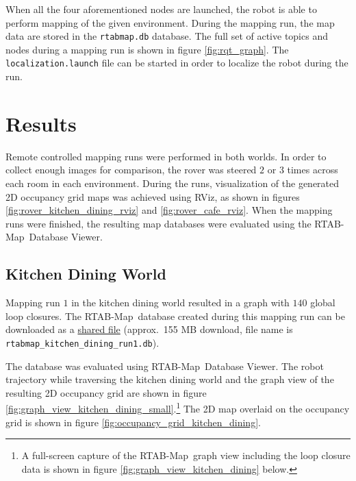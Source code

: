 \documentclass[10pt, journal, compsoc]{IEEEtran}
\newcommand{\rtab}{RTAB-Map}
\begin{document}
When all the four aforementioned nodes are launched, the robot is able to perform mapping of the given environment. During the mapping run, the map data are stored in the \texttt{rtabmap.db} database. The full set of active topics and nodes during a mapping run is shown in figure \ref{fig:rqt_graph}. The \texttt{localization.launch} file can be started in order to localize the robot during the run.  

\section{Results}
\label{sec:results}
Remote controlled mapping runs were performed in both worlds. In order to collect enough images for comparison, the rover was steered $2$ or $3$ times across each room in each environment. During the runs, visualization of the generated 2D occupancy grid maps was achieved using RViz, as shown in figures \ref{fig:rover_kitchen_dining_rviz} and \ref{fig:rover_cafe_rviz}. When the mapping runs were finished, the resulting map databases were evaluated using the \rtab\ Database Viewer.
\subsection{Kitchen Dining World}
Mapping run $1$ in the kitchen dining world resulted in a graph with $140$ global loop closures. The \rtab\ database created during this mapping run can be downloaded as a \href{https://drive.google.com/open?id=1t1IpTFzVJdJpQvhg2gkvDuGDFBH2YYIq}{shared file} (approx.\ 155 MB download, file name is \texttt{rtabmap\_kitchen\_dining\_run1.db}).

The database was evaluated using \rtab \ Database Viewer. The robot trajectory while traversing the kitchen dining world and the graph view of the resulting 2D occupancy grid are shown in figure \ref{fig:graph_view_kitchen_dining_small}.\footnote{A full-screen capture of the \rtab\ graph view including the loop closure data is shown in figure \ref{fig:graph_view_kitchen_dining} below.} The 2D map overlaid on the occupancy grid is shown in figure \ref{fig:occupancy_grid_kitchen_dining}. 
\end{document}
